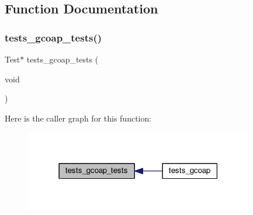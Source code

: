 \subsection{Function Documentation}
\mbox{\label{tests-gcoap_8c_a8f0dd03a14c51255b591cacf309611d8}} 
\subsubsection{\texorpdfstring{tests\+\_\+gcoap\+\_\+tests()}{tests\_gcoap\_tests()}}
{\footnotesize\ttfamily Test$\ast$ tests\+\_\+gcoap\+\_\+tests (\begin{DoxyParamCaption}\item[{void}]{ }\end{DoxyParamCaption})}

Here is the caller graph for this function\+:
\nopagebreak
\begin{figure}[H]
\begin{center}
\leavevmode
\includegraphics[width=283pt]{tests-gcoap_8c_a8f0dd03a14c51255b591cacf309611d8_icgraph}
\end{center}
\end{figure}
